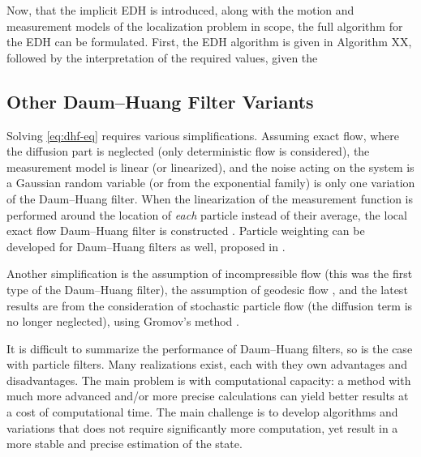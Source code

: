 Now, that the implicit EDH is introduced, along with the motion and measurement models
of the localization problem in scope, the full algorithm for the EDH can be formulated.
First, the EDH algorithm is given in Algorithm XX, followed by the interpretation of
the required values, given the
\subsection{Other Daum--Huang Filter Variants}

Solving \eqref{eq:dhf-eq} requires various simplifications. Assuming exact flow, where the diffusion part is neglected (only deterministic flow is considered), the measurement model is linear (or linearized), and the noise acting on the system is a Gaussian random variable (or from the exponential family) is only one variation of the Daum--Huang filter. When the linearization of the measurement function is performed around the location of \emph{each} particle instead of their average, the local exact flow Daum--Huang filter is constructed \cite{EDH-Coates}. Particle weighting can be developed for Daum--Huang filters as well, proposed in \cite{pfpf_coates}.

Another simplification is the assumption of incompressible flow \cite{dhf_first}  (this was the first type of the Daum--Huang filter), the assumption of geodesic flow \cite{geodesic}, and the latest results are from the consideration of stochastic particle flow (the diffusion term is no longer neglected), using Gromov's method \cite{gromov}.

It is difficult to summarize the performance of Daum--Huang filters, so is the case with particle filters. Many realizations exist, each with they own advantages and disadvantages. The main problem is with computational capacity: a method with much more advanced and/or more precise calculations can yield better results at a cost of computational time. The main challenge is to develop algorithms and variations that does not require significantly more computation, yet result in a more stable and precise estimation of the state.